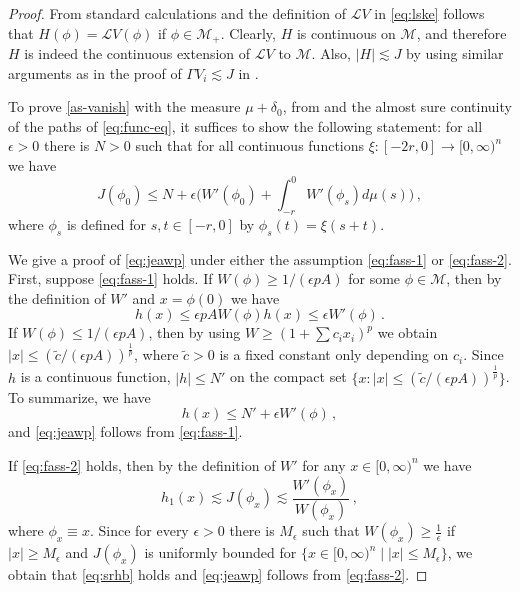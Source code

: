 \documentclass[final]{amsart}
\numberwithin{thm}{section}
\numberwithin{equation}{section}
\newcommand{\mcM}{\mathcal{M}}
\newcommand{\Ll}{\mathcal{L}}
\begin{document}
\begin{proof}
From standard calculations and the definition of $\Ll V$ in \eqref{eq:lske} follows that $H(\phi) = \Ll V(\phi)$ if $\phi \in \mcM_+$. Clearly, $H$ is continuous on $\mcM$, and therefore
 $H$ is indeed the continuous extension of $\Ll V$ to $\mcM$.
  Also, $|H| \lesssim J$ by using similar arguments as in the proof of $\Gamma V_i \lesssim J$ in .
    
     To prove \ref{as-vanish}  with the measure $\mu + \delta_0$, 
    from  and the almost sure continuity of the paths of \eqref{eq:func-eq}, it suffices to show the following statement: for all $\epsilon > 0$ there is $N > 0$ such that for all continuous functions $\xi: [-2r, 0] \to [0,\infty)^n$ we have \begin{equation}\label{eq:jeawp}
        J(\phi_0) \leq N + \epsilon \Big(W'(\phi_0) + \int_{-r}^0 W'(\phi_s)d\mu(s)\Big) \,,
    \end{equation} 
    where $\phi_s$ is defined for $s,t \in [-r,0]$ by $\phi_s(t) = \xi(s+t)$.

    We give a proof of \eqref{eq:jeawp} under either the assumption \eqref{eq:fass-1} or \eqref{eq:fass-2}. First, suppose \eqref{eq:fass-1} holds. If $W(\phi) \geq 1/(\epsilon pA)$ for some $\phi \in \mcM$, then by the definition of $W'$ 
    and $x = \phi(0)$ we have 
    $$
    h(x) \leq \epsilon pAW(\phi) h(x) \leq \epsilon W'(\phi) \,.
    $$ 
    If $W(\phi) \leq 1/(\epsilon pA)$, then  
    by using $W \geq (1+\sum c_ix_i)^p$ we obtain
    $|x| \leq (\tilde{c}/(\epsilon pA))^{\frac{1}{p}}$, where $\tilde{c} > 0$ is a fixed constant only depending on $c_i$. Since $h$ is a continuous function, $|h| \leq N'$ 
    on the compact set $\{x: |x| \leq (\tilde{c}/(\epsilon pA))^{\frac{1}{p}}\}$. To summarize, we have 
    \begin{equation}\label{eq:srhb}
    h(x) \leq N' + \epsilon W'(\phi) \,,    
    \end{equation}
    and \eqref{eq:jeawp} follows from \eqref{eq:fass-1}.

    
    If \eqref{eq:fass-2} holds, then by the definition of $W'$ for any $x \in [0, \infty)^n$ we have
    $$
    h_1(x) \lesssim J(\phi_x) \lesssim \frac{W'(\phi_x)}{W(\phi_x)} \,,
    $$
    where $\phi_x \equiv x$. Since for every $\epsilon > 0$
    there is $M_\epsilon$ such that $W(\phi_x) \geq \frac{1}{\epsilon}$ if $|x| \geq M_\epsilon$ and 
    $J(\phi_x)$ is uniformly bounded for $\{x \in [0, \infty)^n  \mid |x| \leq M_\epsilon\}$, we obtain that \eqref{eq:srhb} holds and \eqref{eq:jeawp} follows from \eqref{eq:fass-2}. 
\end{proof}
\end{document}
